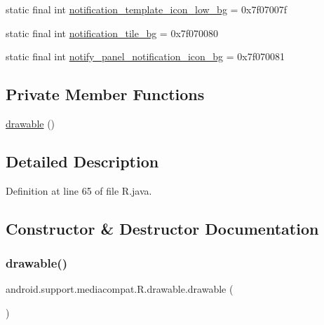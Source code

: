 \begin{DoxyCompactItemize}
\item 
static final int \mbox{\hyperlink{classandroid_1_1support_1_1mediacompat_1_1_r_1_1drawable_aa387aaa3835959e25ba0b23273f5cdde}{notification\+\_\+template\+\_\+icon\+\_\+low\+\_\+bg}} = 0x7f07007f
\item 
static final int \mbox{\hyperlink{classandroid_1_1support_1_1mediacompat_1_1_r_1_1drawable_a3e361078e38f4d19d7c16e43feafd1e2}{notification\+\_\+tile\+\_\+bg}} = 0x7f070080
\item 
static final int \mbox{\hyperlink{classandroid_1_1support_1_1mediacompat_1_1_r_1_1drawable_a1111dc9feb55483a5e44a84481588b18}{notify\+\_\+panel\+\_\+notification\+\_\+icon\+\_\+bg}} = 0x7f070081
\end{DoxyCompactItemize}
\subsection*{Private Member Functions}
\begin{DoxyCompactItemize}
\item 
\mbox{\hyperlink{classandroid_1_1support_1_1mediacompat_1_1_r_1_1drawable_a334f70a9ca58d1e365f9e160625d532f}{drawable}} ()
\end{DoxyCompactItemize}


\subsection{Detailed Description}


Definition at line 65 of file R.\+java.



\subsection{Constructor \& Destructor Documentation}
\mbox{\label{classandroid_1_1support_1_1mediacompat_1_1_r_1_1drawable_a334f70a9ca58d1e365f9e160625d532f}} 
\subsubsection{\texorpdfstring{drawable()}{drawable()}}
{\footnotesize\ttfamily android.\+support.\+mediacompat.\+R.\+drawable.\+drawable (\begin{DoxyParamCaption}{ }\end{DoxyParamCaption})\hspace{0.3cm}{\ttfamily [private]}}



